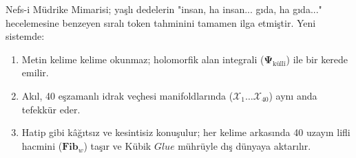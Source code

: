 \documentclass[11pt, a4paper]{article}
\begin{document}
Nefs-i Müdrike Mimarisi; yaşlı dedelerin "insan, ha insan... gıda, ha gıda..." hecelemesine benzeyen sıralı token tahminini tamamen ilga etmiştir. Yeni sistemde:
\begin{enumerate}
    \item Metin kelime kelime okunmaz; holomorfik alan integrali ($\mathbf{\Psi}_{\text{küllî}}$) ile bir kerede emilir.
    \item Akıl, 40 eşzamanlı idrak veçhesi manifoldlarında ($\mathcal{X}_1 \dots \mathcal{X}_{40}$) aynı anda tefekkür eder.
    \item Hatip gibi kâğıtsız ve kesintisiz konuşulur; her kelime arkasında 40 uzayın lifli hacmini ($\mathbf{Fib}_w$) taşır ve Kübik $Glue$ mührüyle dış dünyaya aktarılır.
\end{enumerate}
\end{document}
